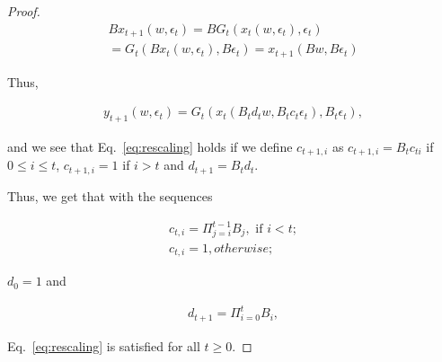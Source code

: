 \documentclass[jair, twoside,11pt,theapa]{article}
\begin{document}
\begin{proof}
\begin{equation}
    \begin{array}{l}
         B{x_{t+1}} (w, \epsilon_t) = B G_t (x_t(w, \epsilon_t), \epsilon_t)\\
         = G_t(B{x_t}(w, \epsilon_t), B\epsilon_t)
        = x_{t+1}(B w, B \epsilon_t)
             \end{array}
\end{equation}

\noindent Thus, 

\begin{equation}
    \begin{array}{l}
         y_{t+1}(w,\epsilon_t) = G_t (x_t (B_t d_t w, B_t c_t \epsilon_t), B_t \epsilon_t), 
        
    \end{array}
\end{equation}


\noindent and we see that Eq.~\ref{eq:rescaling} holds if we define $c_{t+1,i}$ as $c_{t+1,i} = B_t c_{ti}$ if $0 \leq i \leq t$, $c_{t+1, i} = 1$ if $i>t$ and $d_{t+1} = B_t d_t$.

Thus, we get that with the sequences 

\begin{equation}
    \begin{array}{l}
         c_{t,i} = \Pi_{j=i}^{t-1}B_j, \textrm{ if } i<t;
         \\
          c_{t,i} = 1, otherwise;
         
    \end{array}
\end{equation}

\noindent $d_0 = 1$ and 

\begin{equation}
    \begin{array}{l}
         d_{t+1} = \Pi^t_{i=0} B_i, 
    \end{array}
\end{equation}

\noindent Eq.~\ref{eq:rescaling} is satisfied for all $t\geq0$. 




\end{proof}
\end{document}

